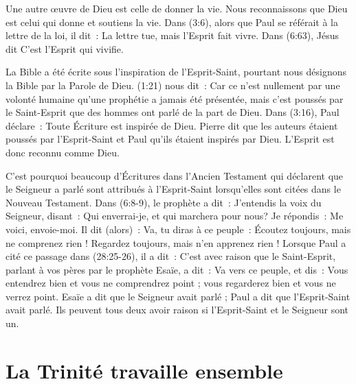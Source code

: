 Une autre œuvre de Dieu est celle de donner la vie. Nous reconnaissons que Dieu
 est celui qui donne et soutiens la vie.
 Dans (3:6), alors que Paul se référait à la lettre de la loi,
 il dit~: \og La lettre tue, mais l'Esprit fait vivre. \fg{}
 Dans (6:63), Jésus dit \og C'est l'Esprit qui vivifie.\fg{}

La Bible a été écrite sous l'inspiration de l'Esprit-Saint, pourtant nous
 désignons la Bible par la Parole de Dieu.
 (1:21) nous dit~:
 \og Car ce n'est nullement par une volonté humaine qu'une prophétie a jamais
 été présentée, mais c'est poussés par le Saint-Esprit que des hommes ont parlé
 de la part de Dieu. \fg{}
 Dans (3:16), Paul déclare~:
 \og Toute Écriture est inspirée de Dieu. \fg{}
 Pierre dit que les auteurs étaient poussés par l'Esprit-Saint et Paul qu'ils
 étaient inspirés par Dieu. L'Esprit est donc reconnu comme Dieu.

C'est pourquoi beaucoup d'Écritures dans l'Ancien Testament qui déclarent que
 le Seigneur a parlé sont attribués à l'Esprit-Saint lorsqu'elles sont citées
 dans le Nouveau Testament.
 Dans (6:8-9), le prophète a dit~: \og J'entendis la voix du
 Seigneur, disant~: Qui enverrai-je, et qui marchera pour nous? Je répondis~:
 Me voici, envoie-moi. Il dit (alors)~: Va, tu diras à ce peuple~:
 Écoutez toujours, mais ne comprenez rien ! Regardez toujours, mais n'en
 apprenez rien ! \fg{}
 Lorsque Paul a cité ce passage dans (28:25-26), il a dit~:
 \og C'est avec raison que le Saint-Esprit, parlant à vos pères par le
 prophète Esaïe, a dit~: Va vers ce peuple, et dis~: Vous entendrez bien et
 vous ne comprendrez point ; vous regarderez bien et vous ne verrez point. \fg{}
 Esaïe a dit que le Seigneur avait parlé ; Paul a dit que l'Esprit-Saint
 avait parlé.
 Ils peuvent tous deux avoir raison si l'Esprit-Saint et le Seigneur sont un.


\section*{La Trinité travaille ensemble}

